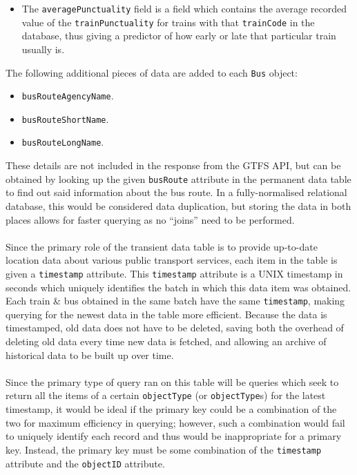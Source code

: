 \documentclass[a4paper,11pt]{report}
\begin{document}
\begin{itemize}
    \item   The \verb|averagePunctuality| field is a field which contains the average recorded value of the \verb|trainPunctuality| for trains with that \verb|trainCode| in the database, thus giving a predictor of how early or late that particular train usually is.
\end{itemize}

The following additional pieces of data are added to each \verb|Bus| object:
\begin{itemize}
    \item   \verb|busRouteAgencyName|.
    \item   \verb|busRouteShortName|.
    \item   \verb|busRouteLongName|.
\end{itemize}

These details are not included in the response from the GTFS API, but can be obtained by looking up the given \verb|busRoute| attribute in the permanent data table to find out said information about the bus route.
In a fully-normalised relational database, this would be considered data duplication, but storing the data in both places allows for faster querying as no ``joins'' need to be performed.
\\\\
Since the primary role of the transient data table is to provide up-to-date location data about various public transport services, each item in the table is given a \verb|timestamp| attribute.
This \verb|timestamp| attribute is a UNIX timestamp in seconds which uniquely identifies the batch in which this data item was obtained.
Each train \& bus obtained in the same batch have the same \verb|timestamp|, making querying for the newest data in the table more efficient.
Because the data is timestamped, old data does not have to be deleted, saving both the overhead of deleting old data every time new data is fetched, and allowing an archive of historical data to be built up over time. 
\\\\
Since the primary type of query ran on this table will be queries which seek to return all the items of a certain \verb|objectType| (or \verb|objectType|s) for the latest timestamp, it would be ideal if the primary key could be a combination of the two for maximum efficiency in querying;
however, such a combination would fail to uniquely identify each record and thus would be inappropriate for a primary key.
Instead, the primary key must be some combination of the \verb|timestamp| attribute and the \verb|objectID| attribute.
\end{document}
